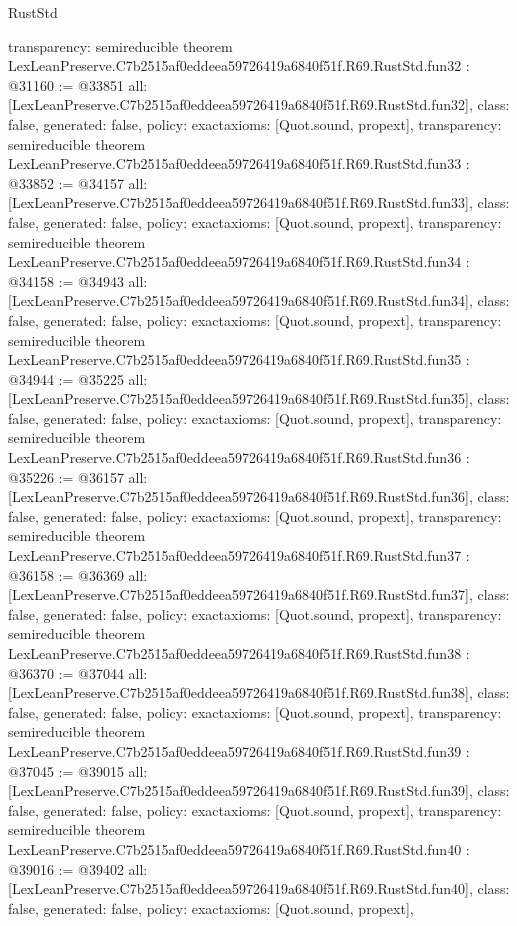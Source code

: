 \begin{lexlean}{RustStd}
\begin{coremodule}
{  transparency: semireducible
}
theorem LexLeanPreserve.C7b2515af0eddeea59726419a6840f51f.R69.RustStd.fun32 : @31160 := @33851 {
  all: [LexLeanPreserve.C7b2515af0eddeea59726419a6840f51f.R69.RustStd.fun32],
  class: false,
  generated: false,
  policy: exact{axioms: [Quot.sound, propext]},
  transparency: semireducible
}
theorem LexLeanPreserve.C7b2515af0eddeea59726419a6840f51f.R69.RustStd.fun33 : @33852 := @34157 {
  all: [LexLeanPreserve.C7b2515af0eddeea59726419a6840f51f.R69.RustStd.fun33],
  class: false,
  generated: false,
  policy: exact{axioms: [Quot.sound, propext]},
  transparency: semireducible
}
theorem LexLeanPreserve.C7b2515af0eddeea59726419a6840f51f.R69.RustStd.fun34 : @34158 := @34943 {
  all: [LexLeanPreserve.C7b2515af0eddeea59726419a6840f51f.R69.RustStd.fun34],
  class: false,
  generated: false,
  policy: exact{axioms: [Quot.sound, propext]},
  transparency: semireducible
}
theorem LexLeanPreserve.C7b2515af0eddeea59726419a6840f51f.R69.RustStd.fun35 : @34944 := @35225 {
  all: [LexLeanPreserve.C7b2515af0eddeea59726419a6840f51f.R69.RustStd.fun35],
  class: false,
  generated: false,
  policy: exact{axioms: [Quot.sound, propext]},
  transparency: semireducible
}
theorem LexLeanPreserve.C7b2515af0eddeea59726419a6840f51f.R69.RustStd.fun36 : @35226 := @36157 {
  all: [LexLeanPreserve.C7b2515af0eddeea59726419a6840f51f.R69.RustStd.fun36],
  class: false,
  generated: false,
  policy: exact{axioms: [Quot.sound, propext]},
  transparency: semireducible
}
theorem LexLeanPreserve.C7b2515af0eddeea59726419a6840f51f.R69.RustStd.fun37 : @36158 := @36369 {
  all: [LexLeanPreserve.C7b2515af0eddeea59726419a6840f51f.R69.RustStd.fun37],
  class: false,
  generated: false,
  policy: exact{axioms: [Quot.sound, propext]},
  transparency: semireducible
}
theorem LexLeanPreserve.C7b2515af0eddeea59726419a6840f51f.R69.RustStd.fun38 : @36370 := @37044 {
  all: [LexLeanPreserve.C7b2515af0eddeea59726419a6840f51f.R69.RustStd.fun38],
  class: false,
  generated: false,
  policy: exact{axioms: [Quot.sound, propext]},
  transparency: semireducible
}
theorem LexLeanPreserve.C7b2515af0eddeea59726419a6840f51f.R69.RustStd.fun39 : @37045 := @39015 {
  all: [LexLeanPreserve.C7b2515af0eddeea59726419a6840f51f.R69.RustStd.fun39],
  class: false,
  generated: false,
  policy: exact{axioms: [Quot.sound, propext]},
  transparency: semireducible
}
theorem LexLeanPreserve.C7b2515af0eddeea59726419a6840f51f.R69.RustStd.fun40 : @39016 := @39402 {
  all: [LexLeanPreserve.C7b2515af0eddeea59726419a6840f51f.R69.RustStd.fun40],
  class: false,
  generated: false,
  policy: exact{axioms: [Quot.sound, propext]},
}
\end{coremodule}
\end{lexlean}
